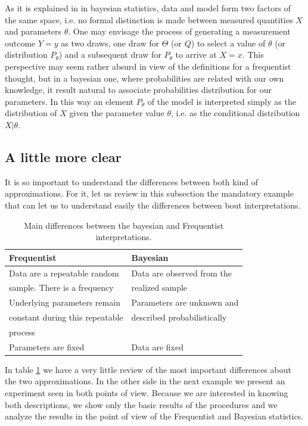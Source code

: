 \documentclass[onecolumn,           %
               showpacs,            %
               preprintnumbers,     %
               aps,                 %
               prl,          	    %
               letterpaper,             %
               superscriptaddress,      %
               nofootinbib,         %
               tightenlines,        %
               floats,floatfix      %
               ,usenatbib,
               ]{revtex4-1}
\begin{document}
As it is explained in \cite{bayeslecture} in bayesian statistics, data and model form two factors of the same space, i.e. no formal distinction is made between measured quantities $X$ and parameters $\theta$. One may envisage the process of generating a measurement outcome $Y=y$ as two draws, one draw for $\Theta$ (or $Q$)
to select a value of $\theta$ (or distribution $P_\theta$) and a subsequent draw for $P_\theta$ to arrive at $X=x$. This perspective may seem rather absurd in view of the definitions for a frequentist thought, but in a bayesian one, where probabilities are related with our own knowledge, it result natural to associate probabilities distribution for our parameters. In this way an element $P_\theta$ of the model is interpreted simply as the distribution of $X$ given the parameter value $\theta$, i.e. as the conditional distribution $X|\theta$.
\subsection{A little more clear}

It is so important to understand the differences between both kind of approximations. For it, let us review in this subsection the mandatory example that can let us to understand easily the differences between bout interpretations.
\begin{table}[h!]
\centering
\begin{tabular}{||l|l||} 
 \hline
 \textbf{Frequentist} & \textbf{Bayesian} \\ [0.5ex] 
 \hline\hline
 Data are a repeatable random  & Data are observed from the   \\ 
 sample. There is a frequency & realized sample \\
 \hline 
 Underlying parameters remain & Parameters are unknown and \\
 constant during this repeatable & described probabilistically \\
 process &  \\
\hline
Parameters are fixed & Data are fixed\\ [1ex] 
 \hline
\end{tabular}
\caption{\footnotesize{Main differences between the bayesian and Frequentist interpretations.}}
\label{table:1}
\end{table}

In table \ref{table:1} we have a very little review of the most important differences about the two approximations. In the other side in the next example we present an experiment seen in both points of view. Because we are interested in knowing both descriptions, we show only the basic results of the procedures and we analyze the results in the point of view of the Frequentist and Bayesian statistics. 
\end{document}
